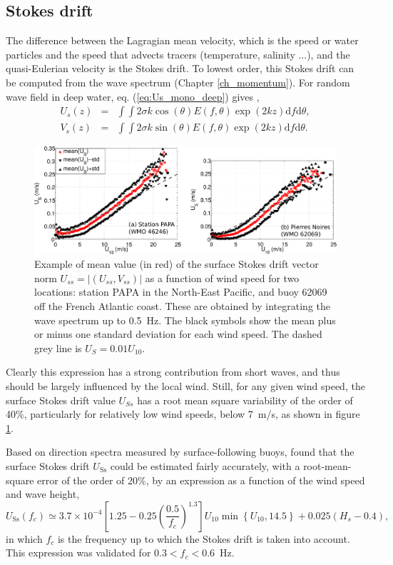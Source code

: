 \subsection{Stokes drift}
The difference between the Lagragian mean velocity, which is the speed or water particles and the speed that advects tracers (temperature, salinity ...), and the quasi-Eulerian velocity is the Stokes drift. To lowest order, this Stokes drift can be computed from the wave spectrum (Chapter \ref{ch_momentum}). For random wave field in deep water, eq. (\ref{eq:Us_mono_deep}) gives \citep{Kenyon1969},
\begin{eqnarray}
 U_s (z)&=& \int\int 2 \sigma k \cos(\theta) E(f,\theta) \exp(2kz) {\mathrm d}f {\mathrm d} \theta, \\
 V_s (z)&=& \int\int 2 \sigma k \sin(\theta) E(f,\theta) \exp(2kz) {\mathrm d}f {\mathrm d} \theta.
\end{eqnarray}
\begin{figure}[htb]
\includegraphics[width=0.9\linewidth]{FIGS_CH_AIRSEA/Us_PAPA_62069_line.pdf}
\caption{Example of mean value (in red) of the surface Stokes drift vector norm $U_{ss}=|(U_{ss},V_{ss})|$ as a function of wind speed for two locations: station PAPA in the North-East Pacific, and buoy 62069 off the French Atlantic coast. These are obtained by integrating the wave spectrum up to 0.5~Hz. The black symbols show the mean plus or minus one standard deviation for each wind speed. The dashed grey line is $U_S = 0.01 U_{10}$.   \label{fig:USU10}}
\end{figure}


Clearly this expression has a strong contribution from short waves, and thus should be largely influenced by the local wind. 
Still, for any given wind speed, the surface Stokes drift value $U_{Ss}$ has a root mean square variability of the order of 40\%, particularly for relatively low wind speeds, below 7~m/s, as shown in figure \ref{fig:USU10}.

Based on direction spectra measured by surface-following buoys, 
\cite{Ardhuin&al.2009} found that the surface Stokes drift  $U_{\mathrm{Ss}}$ could be estimated fairly accurately, with a root-mean-square error of the order of 20\%, by an expression as a function of the wind speed and wave height, 
\begin{equation}
U_{\mathrm{Ss}}(f_c)\simeq 3.7\times 10^{-4}
\left[1.25-0.25\left(\frac{0.5}{f_c}\right)^{1.3}\right] U_{10}
 \min\left\{U_{10},14.5\right\} + 0.025\left(
H_s-0.4\right),\label{Uss_U10}
\end{equation}
in which  $f_c$ is the frequency up to which the Stokes drift is taken into account. This 
expression was validated for $0.3<f_c<0.6$~Hz. 




